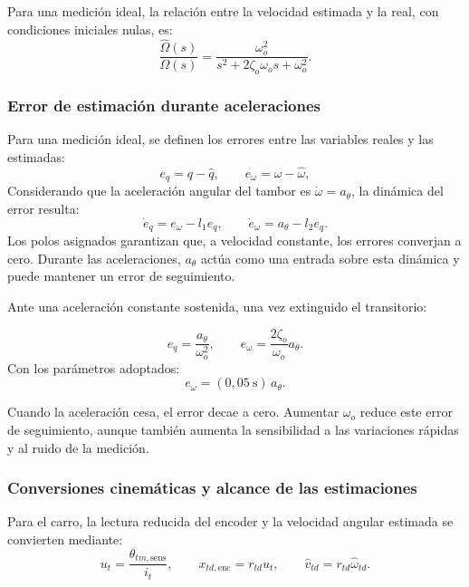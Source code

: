 \documentclass[a4paper,10pt,onecolumn,journal]{ieeeconf}
\numberwithin{equation}{section}
\begin{document}
Para una medición ideal, la relación entre la velocidad estimada y la real, con condiciones iniciales nulas, es:
\begin{equation}
\boxed{\frac{\hat\Omega(s)}{\Omega(s)}=
\frac{\omega_o^2}{s^2+2\zeta_o\omega_os+\omega_o^2}}.
\end{equation}


\subsubsection{Error de estimación durante aceleraciones}

Para una medición ideal, se definen los errores entre las variables reales y las estimadas:
\begin{equation}
e_q=q-\hat q,\qquad e_\omega=\omega-\hat\omega,
\end{equation}
Considerando que la aceleración angular del tambor es \(\dot\omega=a_\theta\), la dinámica del error resulta:
\begin{equation}
\boxed{\dot e_q=e_\omega-l_1e_q},\qquad
\boxed{\dot e_\omega=a_\theta-l_2e_q}.
\end{equation}
Los polos asignados garantizan que, a velocidad constante, los errores converjan a cero. Durante las aceleraciones, \(a_\theta\) actúa como una entrada sobre esta dinámica y puede mantener un error de seguimiento.

Ante una aceleración constante sostenida, una vez extinguido el transitorio:

\begin{equation}
e_q=\frac{a_\theta}{\omega_o^2},\qquad
e_\omega=\frac{2\zeta_o}{\omega_o}a_\theta.
\end{equation}
Con los parámetros adoptados:
\begin{equation}
\boxed{e_\omega=(0{,}05\ \mathrm{s})\,a_\theta}.
\end{equation}

Cuando la aceleración cesa, el error decae a cero. Aumentar \(\omega_o\) reduce este error de seguimiento, aunque también aumenta la sensibilidad a las variaciones rápidas y al ruido de la medición.


\subsubsection{Conversiones cinemáticas y alcance de las estimaciones}

Para el carro, la lectura reducida del encoder y la velocidad angular estimada se convierten mediante:
\begin{equation}
u_t=\frac{\theta_{tm,\mathrm{sens}}}{i_t},\qquad
x_{td,\mathrm{enc}}=r_{td}u_t,\qquad
\hat v_{td}=r_{td}\hat\omega_{td}.
\end{equation}
\end{document}
